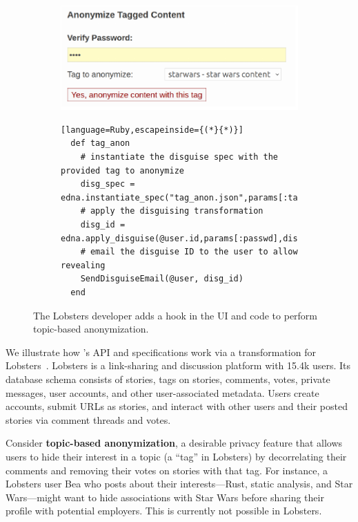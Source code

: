 \begin{figure}[h]
  \centering
  \begin{subfigure}[h]{0.5\columnwidth}
  \includegraphics[width=\columnwidth]{figs/lobsters_catanon}
  \end{subfigure}
  \begin{subfigure}[h]{\columnwidth}
  \begin{lstlisting}[language=Ruby,escapeinside={(*}{*)}]
  def tag_anon
    # instantiate the disguise spec with the provided tag to anonymize
    disg_spec = edna.instantiate_spec("tag_anon.json",params[:tag])
    # apply the disguising transformation
    disg_id = edna.apply_disguise(@user.id,params[:passwd],disg_spec)
    # email the disguise ID to the user to allow revealing
    SendDisguiseEmail(@user, disg_id)
  end
  \end{lstlisting}
  \end{subfigure}
  \vspace*{-1em}
    \caption[Hook to invoke topic-based anonymization.]{The Lobsters developer adds a hook in the UI and code to perform
      topic-based anonymization.}
  \label{f:lobsters_hook}
  \end{figure}

We illustrate how \sys's API and \xx specifications work via a \xxing
transformation for Lobsters~\cite{lobsters}.  Lobsters is a
link-sharing and discussion platform with 15.4k
users.
%
Its database schema consists of stories, tags on stories, comments, votes,
private messages, user accounts, and other user-associated metadata.
%
Users create accounts, submit URLs as stories, and interact with other users
and their posted stories via comment threads and votes.
%

Consider \textbf{topic-based anonymization}, a desirable privacy feature that allows users to
hide their interest in a topic (a ``tag'' in Lobsters) by decorrelating
their comments and removing their votes on stories with that tag.
%
For instance, a Lobsters user Bea who posts about their interests---Rust,
static analysis, and Star Wars---might want to hide associations with
Star Wars before sharing their profile with potential employers.
%
This is currently not possible in Lobsters.


